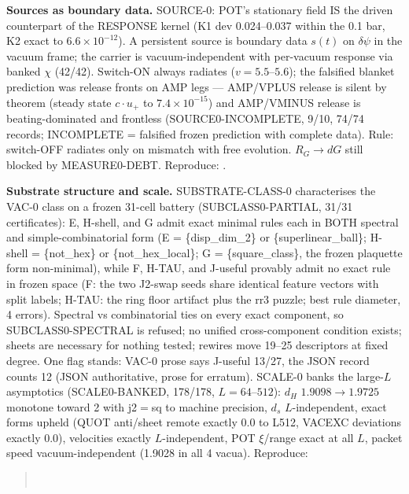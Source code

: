 \documentclass[11pt]{article}
\begin{document}
\textbf{Sources as boundary data.} SOURCE-0: POT's stationary field IS the
driven counterpart of the RESPONSE kernel (K1 dev 0.024--0.037 within the
0.1 bar, K2 exact to $6.6\times10^{-12}$). A persistent source is boundary
data $s(t)$ on $\delta\psi$ in the vacuum frame; the carrier is
vacuum-independent with per-vacuum response via banked $\chi$ (42/42).
Switch-ON always radiates ($v = 5.5$--$5.6$); the falsified blanket
prediction was release fronts on AMP legs --- AMP/VPLUS release is silent
by theorem (steady state $c\cdot u_+$ to $7.4\times10^{-15}$) and
AMP/VMINUS release is beating-dominated and frontless (SOURCE0-INCOMPLETE,
9/10, 74/74 records; INCOMPLETE = falsified frozen prediction with
complete data). Rule: switch-OFF radiates only on mismatch with free
evolution. $R_G \to dG$ still blocked by MEASURE0-DEBT.
Reproduce: .

\textbf{Substrate structure and scale.} SUBSTRATE-CLASS-0 characterises the
VAC-0 class on a frozen 31-cell battery (SUBCLASS0-PARTIAL, 31/31
certificates): E, H-shell, and G admit exact minimal rules each in BOTH
spectral and simple-combinatorial form (E = \{disp\_dim\_2\} or
\{superlinear\_ball\}; H-shell = \{not\_hex\} or \{not\_hex\_local\}; G =
\{square\_class\}, the frozen plaquette form non-minimal), while F, H-TAU,
and J-useful provably admit no exact rule in frozen space (F: the two J2-swap
seeds share identical feature vectors with split labels; H-TAU: the ring
floor artifact plus the rr3 puzzle; best rule diameter, 4 errors). Spectral
vs combinatorial ties on every exact component, so SUBCLASS0-SPECTRAL is
refused; no unified cross-component condition exists; sheets are necessary
for nothing tested; rewires move 19--25 descriptors at fixed degree. One
flag stands: VAC-0 prose says J-useful 13/27, the JSON record counts 12
(JSON authoritative, prose for erratum). SCALE-0 banks the large-$L$
asymptotics (SCALE0-BANKED, 178/178, $L = 64$--$512$): $d_H$
$1.9098 \to 1.9725$ monotone toward 2 with j2${}={}$sq to machine
precision, $d_s$ $L$-independent, exact forms upheld (QUOT anti/sheet remote
exactly 0.0 to L512, VACEXC deviations exactly 0.0), velocities exactly
$L$-independent, POT $\xi$/range exact at all $L$, packet speed
vacuum-independent (1.9028 in all 4 vacua).
Reproduce:
\begin{quote}\small
{}\\
\end{quote}
\end{document}
